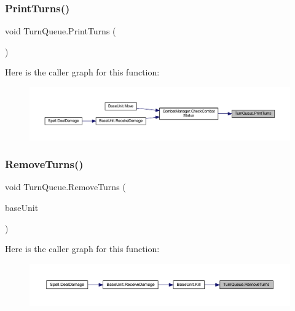 \subsubsection{\texorpdfstring{PrintTurns()}{PrintTurns()}}
{\footnotesize\ttfamily void Turn\+Queue.\+Print\+Turns (\begin{DoxyParamCaption}{ }\end{DoxyParamCaption})}

Here is the caller graph for this function\+:
\nopagebreak
\begin{figure}[H]
\begin{center}
\leavevmode
\includegraphics[width=350pt]{class_turn_queue_ae1c735b715ec963c76f0291cb9629338_icgraph}
\end{center}
\end{figure}
\mbox{\label{class_turn_queue_af6ee9af337f42a417812f4bc96f8d600}} 
\subsubsection{\texorpdfstring{RemoveTurns()}{RemoveTurns()}}
{\footnotesize\ttfamily void Turn\+Queue.\+Remove\+Turns (\begin{DoxyParamCaption}\item[{\mbox{\hyperlink{class_base_unit}{Base\+Unit}}}]{base\+Unit }\end{DoxyParamCaption})}

Here is the caller graph for this function\+:
\nopagebreak
\begin{figure}[H]
\begin{center}
\leavevmode
\includegraphics[width=350pt]{class_turn_queue_af6ee9af337f42a417812f4bc96f8d600_icgraph}
\end{center}
\end{figure}
\mbox{\label{class_turn_queue_afadc89a92617f7b2ee4e93025d2f2217}} 
